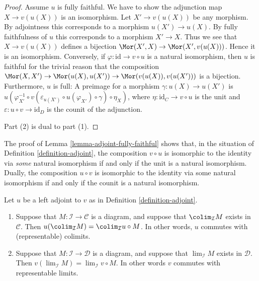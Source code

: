 \begin{proof}
Assume $u$ is fully faithful. We have to show the adjunction map
$X \to v(u(X))$ is an isomorphism. Let $X' \to v(u(X))$ be any morphism.
By adjointness this corresponds to a morphism $u(X') \to u(X)$. By fully
faithfulness of $u$ this corresponds to a morphism $X' \to X$. Thus we
see that $X \to v(u(X))$ defines a bijection
$\Mor(X', X) \to \Mor(X', v(u(X)))$. Hence it is an isomorphism.
Conversely, if $\varphi : \text{id} \to v \circ u$ is a natural
isomorphism, then $u$
is faithful for the trivial reason that the composition $\Mor(X,X') \to
\Mor(u(X),u(X')) \to \Mor(v(u(X)),v(u(X')))$ is a bijection. Furthermore, $u$
is full: A preimage for a morphism $\gamma : u(X) \to u(X')$ is
$u(\varphi_{X'}^{-1} \circ v(\varepsilon_{u(X')} \circ u(\varphi_{X'}) \circ
\gamma) \circ \eta_X)$, where $\eta : \text{id}_C \to v \circ u$ is the
unit and $\varepsilon : u \circ v \to \text{id}_D$ is the counit of the
adjunction.

\medskip\noindent
Part (2) is dual to part (1).
\end{proof}

\begin{remark}
\label{remark-composition-of-adjoints-isomorphic-to-identity}
The proof of Lemma \ref{lemma-adjoint-fully-faithful} shows that, in the
situation of Definition \ref{definition-adjoint}, the composition $v \circ u$
is isomorphic to the identity via \emph{some} natural isomorphism if and only
if the unit is a natural isomorphism. Dually, the composition $u \circ v$ is
isomorphic to the identity via some natural isomorphism if and only if the
counit is a natural isomorphism.
\end{remark}

\begin{lemma}
\label{lemma-adjoint-exact}
Let $u$ be a left adjoint to $v$ as in Definition \ref{definition-adjoint}.
\begin{enumerate}
\item Suppose that $M : \mathcal{I} \to \mathcal{C}$ is a diagram,
and suppose that $\colim_\mathcal{I} M$ exists in
$\mathcal{C}$. Then $u(\colim_\mathcal{I} M) =
\colim_\mathcal{I} u \circ M$. In other words,
$u$ commutes with (representable) colimits.
\item Suppose that $M : \mathcal{I} \to \mathcal{D}$ is a diagram,
and suppose that $\lim_\mathcal{I} M$ exists in
$\mathcal{D}$. Then $v(\lim_\mathcal{I} M) =
\lim_\mathcal{I} v \circ M$. In other words $v$ commutes
with representable limits.
\end{enumerate}
\end{lemma}

